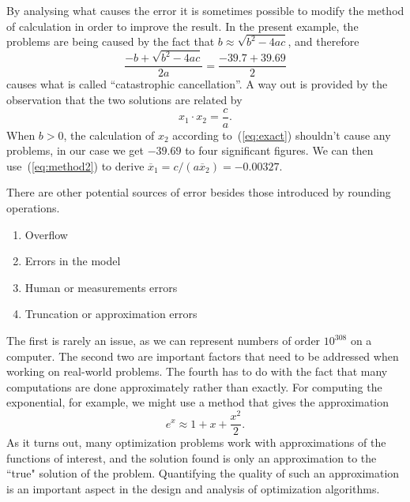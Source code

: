 \documentclass[11pt,a4paper]{memoir}
\begin{document}
\begin{example}
By analysing what causes the error it is sometimes possible to modify the method of calculation in order to improve the result. 
In the present example, the problems are being caused by the fact that $b\approx \sqrt{b^2-4ac}$, and therefore
\begin{equation*}
  \frac{-b+\sqrt{b^2-4ac}}{2a} = \frac{-39.7+39.69}{2}
\end{equation*}
causes what is called ``catastrophic cancellation''. A way out is provided by the observation that the two solutions are related by 
\begin{equation}\label{eq:method2}
  x_1 \cdot x_2 = \frac{c}{a}.
\end{equation}
When $b>0$, the calculation of $x_2$ according to~(\ref{eq:exact}) shouldn't cause any problems, in our case we get $-39.69$ to four significant figures.
We can then use~(\ref{eq:method2}) to derive $\overline{x}_1=c/(a\overline{x}_2)=-0.00327$. 
\end{example}

There are other potential sources of error besides those introduced by rounding operations.

\begin{enumerate}
\item Overflow
\item Errors in the model
\item Human or measurements errors
\item Truncation or approximation errors
\end{enumerate}

The first is rarely an issue, as we can represent numbers of order $10^{308}$ on a computer.
The second two are important factors that need to be addressed when working on real-world problems. The fourth has to do with the fact that many computations are done approximately
rather than exactly. For computing the exponential, for example, we might use a method that gives the approximation
\begin{equation*}
  e^x \approx 1+x+\frac{x^2}{2}.
\end{equation*}
As it turns out, many optimization problems work with approximations of the functions of interest, and the solution found is only an approximation to the ``true" solution of the problem. Quantifying the quality of such an approximation is an important aspect in the design and analysis of optimization algorithms.
\end{document}
